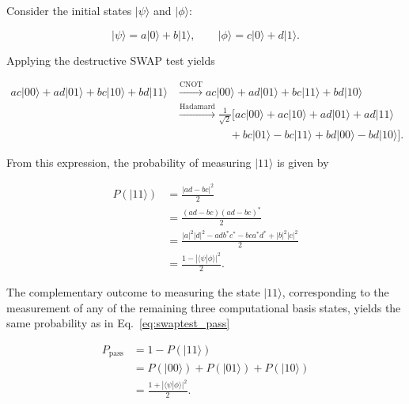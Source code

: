 Consider the initial states \(|\psi\rangle\) and \(|\phi\rangle\):

\begin{equation}
    |\psi\rangle= a|0\rangle+b|1\rangle,
    \qquad
    |\phi\rangle =c|0\rangle+d|1\rangle.
\end{equation}

Applying the destructive SWAP test yields

\begin{equation}
\begin{aligned}
ac|00\rangle+ad|01\rangle+bc|10\rangle+bd|11\rangle
&\xrightarrow{\mathrm{CNOT}}
ac|00\rangle+ad|01\rangle+bc|11\rangle+bd|10\rangle\\
&\xrightarrow{\mathrm{Hadamard}}
\frac{1}{\sqrt{2}}\bigl[
    ac|00\rangle+ac|10\rangle+ad|01\rangle+ad|11\rangle\\
&\hspace{2cm}
    +bc|01\rangle-bc|11\rangle+bd|00\rangle-bd|10\rangle
\bigr].
\end{aligned}
\end{equation}

From this expression, the probability of measuring \(|11\rangle\) is given by

\begin{equation}
\begin{aligned}
    P(|11\rangle)
    &= \frac{|ad-bc|^2}{2} \\
    &= \frac{{(ad-bc)}{(ad-bc)}^*}{2} \\
    &= \frac{|a|^2|d|^2-adb^*c^*-bca^*d^*+|b|^2|c|^2}{2} \\
    &= \frac{1-|\langle\psi|\phi\rangle|^2}{2}.
\end{aligned}
\end{equation}

The complementary outcome to measuring the state \(|11\rangle\), corresponding to the measurement of any of the remaining three computational basis states, yields the same probability as in Eq.~\ref{eq:swaptest_pass}

\begin{equation}
\begin{aligned}
    P_{\mathrm{pass}}
    &= 1 - P(|11\rangle) \\
    &= P(|00\rangle) + P(|01\rangle) + P(|10\rangle) \\
    &= \frac{1 + |\langle \psi | \phi \rangle|^2}{2}.
\end{aligned}
\end{equation}

